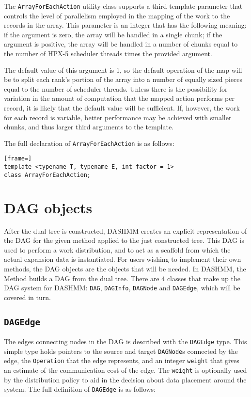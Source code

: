 The \texttt{ArrayForEachAction} utility class supports a third template
parameter that controls the level of parallelism employed in the mapping of
the work to the records in the array. This parameter is an integer that has the
following meaning: if the argument is zero, the array will be handled in a
single chunk; if the argument is positive, the array will be handled in a
number of chunks equal to the number of HPX-5 scheduler threads times the
provided argument.

The default value of this argument is 1, so the default operation of
the map will be to split each rank's portion of the array into a number of
equally sized pieces equal to the number of scheduler threads. Unless there is
the possibility for variation in the amount of computation that the mapped
action performs per record, it is likely that the default value will be
sufficient. If, however, the work for each record is variable, better
performance may be achieved with smaller chunks, and thus larger third
arguments to the template.

The full declaration of \texttt{ArrayForEachAction} is as follows:

\begin{lstlisting}[frame=]
template <typename T, typename E, int factor = 1>
class ArrayForEachAction;
\end{lstlisting}



\section{DAG objects}

After the dual tree is constructed, DASHMM creates an explicit representation
of the DAG for the given method applied to the just constructed tree. This DAG
is used to perform a work distribution, and to act as a scaffold from which
the actual expansion data is instantiated. For users wishing to implement
their own methods, the DAG objects are the objects that will be needed. In
DASHMM, the Method builds a DAG from the dual tree. There are 4 classes that
make up the DAG system for DASHMM: \texttt{DAG}, \texttt{DAGInfo},
\texttt{DAGNode} and \texttt{DAGEdge}, which will be covered in turn.

\subsection{\texttt{DAGEdge}}

The edges connecting nodes in the DAG is described with the \texttt{DAGEdge}
type. This simple type holds pointers to the source and target
\texttt{DAGNode}s connected by the edge, the \texttt{Operation} that the edge
represents, and an integer \texttt{weight} that gives an estimate of the
communication cost of the edge. The \texttt{weight} is optionally used by the
distribution policy to aid in the decision about data placement around the
system. The full definition of \texttt{DAGEdge} is as follows:

